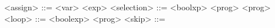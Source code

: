 \begin{grammarEx}
	<assign> ::= <var> \lit{=} <exp>
	<selection> ::=  <bool\textunderscore xp>  <prog>  <prog> 
	<loop> ::=  <bool\textunderscore exp>  <prog> 
	<skip> ::= 
\end{grammarEx}